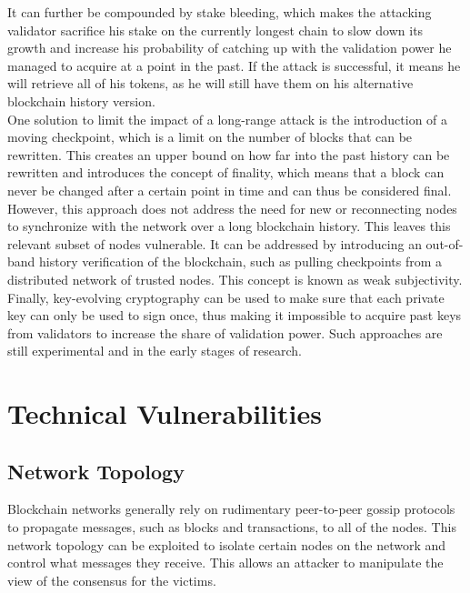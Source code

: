 \documentclass[12pt,a4paper]{article}
\begin{document}
It can further be compounded by stake bleeding, which makes the attacking validator sacrifice his stake on the currently longest chain to slow down its growth and increase his probability of catching up with the validation power he managed to acquire at a point in the past. If the attack is successful, it means he will retrieve all of his tokens, as he will still have them on his alternative blockchain history version.\\

One solution to limit the impact of a long-range attack is the introduction of a moving checkpoint, which is a limit on the number of blocks that can be rewritten. This creates an upper bound on how far into the past history can be rewritten and introduces the concept of finality, which means that a block can never be changed after a certain point in time and can thus be considered final.\\

However, this approach does not address the need for new or reconnecting nodes to synchronize with the network over a long blockchain history. This leaves this relevant subset of nodes vulnerable. It can be addressed by introducing an out-of-band history verification of the blockchain, such as pulling checkpoints from a distributed network of trusted nodes. This concept is known as weak subjectivity.\\

Finally, key-evolving cryptography can be used to make sure that each private key can only be used to sign once, thus making it impossible to acquire past keys from validators to increase the share of validation power. Such approaches are still experimental and in the early stages of research.\\

\section{Technical Vulnerabilities}

\subsection{Network Topology}

Blockchain networks generally rely on rudimentary peer-to-peer gossip protocols to propagate messages, such as blocks and transactions, to all of the nodes. This network topology can be exploited to isolate certain nodes on the network and control what messages they receive. This allows an attacker to manipulate the view of the \gls{consensus} for the victims.\\
\end{document}
